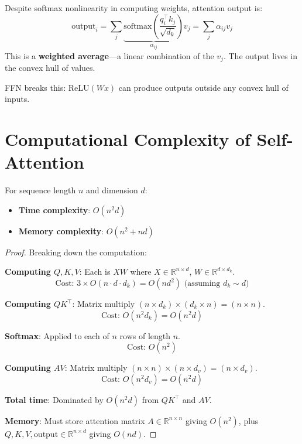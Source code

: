 \begin{remark}
    Despite softmax nonlinearity in computing weights, attention output is:
    \[
        \text{output}_i = \sum_j \underbrace{\text{softmax}\left(\frac{q_i^\top k_j}{\sqrt{d_k}}\right)}_{\alpha_{ij}} v_j = \sum_j \alpha_{ij} v_j
    \]
    This is a \textbf{weighted average}---a linear combination of the $v_j$. The output lives in the convex hull of values.

    FFN breaks this: $\text{ReLU}(Wx)$ can produce outputs outside any convex hull of inputs.
\end{remark}

\section{Computational Complexity of Self-Attention}

\begin{theorem}
    For sequence length $n$ and dimension $d$:
    \begin{itemize}
        \item \textbf{Time complexity}: $O(n^2 d)$
        \item \textbf{Memory complexity}: $O(n^2 + nd)$
    \end{itemize}
\end{theorem}

\begin{proof}
    Breaking down the computation:

    \textbf{Computing $Q, K, V$}: Each is $XW$ where $X \in \mathbb{R}^{n \times d}$, $W \in \mathbb{R}^{d \times d_k}$.
    \[
        \text{Cost: } 3 \times O(n \cdot d \cdot d_k) = O(nd^2) \text{ (assuming } d_k \sim d\text{)}
    \]

    \textbf{Computing $QK^\top$}: Matrix multiply $(n \times d_k) \times (d_k \times n) = (n \times n)$.
    \[
        \text{Cost: } O(n^2 d_k) = O(n^2 d)
    \]

    \textbf{Softmax}: Applied to each of $n$ rows of length $n$.
    \[
        \text{Cost: } O(n^2)
    \]

    \textbf{Computing $AV$}: Matrix multiply $(n \times n) \times (n \times d_v) = (n \times d_v)$.
    \[
        \text{Cost: } O(n^2 d_v) = O(n^2 d)
    \]

    \textbf{Total time}: Dominated by $O(n^2 d)$ from $QK^\top$ and $AV$.

    \textbf{Memory}: Must store attention matrix $A \in \mathbb{R}^{n \times n}$ giving $O(n^2)$, plus $Q, K, V, \text{output} \in \mathbb{R}^{n \times d}$ giving $O(nd)$.
\end{proof}

